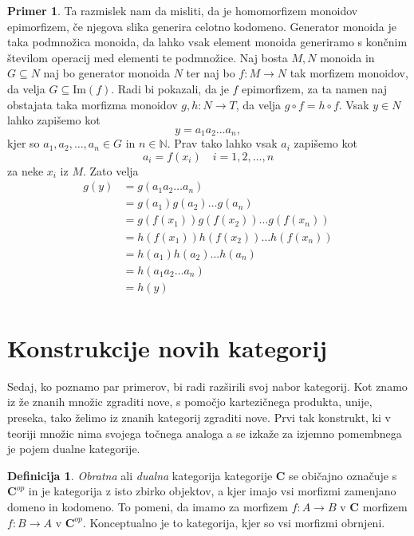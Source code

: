 \documentclass[12pt,a4paper]{book}
\theoremstyle{definition}
\newtheorem{definicija}{Definicija}[chapter]
\theoremstyle{plain}
\theoremstyle{definition}
\newtheorem{primer}{Primer}[section]
\theoremstyle{remark}
\newcommand{\cat}[1]{\textbf{#1}}
\begin{document}
\begin{primer}
Ta razmislek nam da misliti, da je homomorfizem monoidov epimorfizem, če njegova slika generira celotno kodomeno. Generator monoida je taka podmnožica monoida, da lahko vsak element monoida generiramo s končnim številom operacij med elementi te podmnožice. Naj bosta $M,N$ monoida in $G \subseteq N$ naj bo generator monoida $N$ ter naj bo $f: M \to N$ tak morfizem monoidov, da velja $G \subseteq \mathrm{Im}(f)$. Radi bi pokazali, da je $f$ epimorfizem, za ta namen naj obstajata taka morfizma monoidov $g,h: N \to T$, da velja $g \circ f = h \circ f$. Vsak $y \in N$ lahko zapišemo kot 
$$y = a_1 a_2 \ldots a_n,$$
kjer so $a_1,a_2,\ldots,a_n \in G$ in $n \in \mathbb{N}$. Prav tako lahko  vsak $a_i$ zapišemo kot
$$a_i = f(x_i) \quad i=1,2,\ldots,n$$
za neke $x_i$ iz $M$. Zato velja
\begin{align*}
g(y) &= g(a_1 a_2 \ldots a_n) \\
&= g(a_1) g(a_2) \ldots g(a_n) \\
&= g(f(x_1)) g(f(x_2)) \ldots g(f(x_n)) \\
&= h(f(x_1)) h(f(x_2)) \ldots h(f(x_n)) \\
&= h(a_1) h(a_2) \ldots h(a_n) \\
&= h(a_1 a_2 \ldots a_n) \\
&= h(y) \\
\end{align*}


\end{primer}


\section{Konstrukcije novih kategorij}

Sedaj, ko poznamo par primerov, bi radi razširili svoj nabor kategorij. Kot znamo iz že znanih množic zgraditi nove, s pomočjo kartezičnega produkta, unije, preseka, tako želimo iz znanih kategorij zgraditi nove. Prvi tak konstrukt, ki v teoriji množic nima svojega točnega analoga a se izkaže za izjemno pomembnega je pojem dualne kategorije.


\begin{definicija}

\emph{Obratna} ali \emph{dualna} kategorija kategorije $\cat{C}$ se običajno označuje s $\cat{C}^{op}$ in je kategorija z isto zbirko objektov, a kjer imajo vsi morfizmi zamenjano domeno in kodomeno. 
To pomeni, da imamo za morfizem $f : A \to B$ v $\cat{C}$ morfizem $f : B \to A$ v $\cat{C}^{op}$. Konceptualno je to kategorija, kjer so vsi morfizmi obrnjeni.
\end{definicija}
\end{document}
